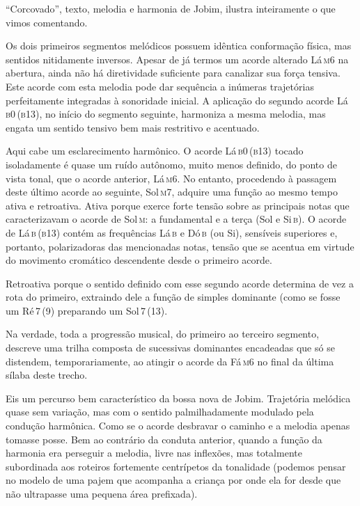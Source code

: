 ``Corcovado'', texto, melodia e harmonia de Jobim, ilustra inteiramente o
que vimos comentando.



Os dois primeiros segmentos melódicos possuem idêntica conformação
física, mas sentidos nitidamente inversos. Apesar de já termos um acorde
alterado Lá\,\textsc{m6} na abertura, ainda não há diretividade suficiente para
canalizar sua força tensiva. Este acorde com esta melodia pode dar
sequência a inúmeras trajetórias perfeitamente integradas à sonoridade
inicial. A aplicação do segundo acorde Lá\,\textsc{b0\,(b13)}, no início do
segmento seguinte, harmoniza a mesma melodia, mas engata um sentido
tensivo bem mais restritivo e acentuado.

Aqui cabe um esclarecimento harmônico. O acorde Lá\,\textsc{b0\,(b13)} tocado
isoladamente é quase um ruído autônomo, muito menos definido, do ponto
de vista tonal, que o acorde anterior, Lá\,\textsc{m6}. No entanto, procedendo à
passagem deste último acorde ao seguinte, Sol\,\textsc{m7}, adquire uma função ao
mesmo tempo ativa e retroativa. Ativa porque exerce forte tensão sobre
as principais notas que caracterizavam o acorde de Sol\,\textsc{m}: a fundamental e
a terça (Sol e Si\,\textsc{b}). O acorde de Lá\,\textsc{b\,(b13)} contém as frequências Lá\,\textsc{b} e
Dó\,\textsc{b} (ou Si), sensíveis superiores e, portanto, polarizadoras das
mencionadas notas, tensão que se acentua em virtude do movimento
cromático descendente desde o primeiro acorde. 



Retroativa porque o sentido definido com esse segundo acorde determina
de vez a rota do primeiro, extraindo dele a função de simples dominante
(como se fosse um Ré\,\textsc{7\,(9)} preparando um Sol\,\textsc{7\,(13)}.

Na verdade, toda a progressão musical, do primeiro ao terceiro segmento,
descreve uma trilha composta de sucessivas dominantes encadeadas que só
se distendem, temporariamente, ao atingir o acorde da Fá\,\textsc{m6} no final da
última sílaba deste trecho.


Eis um percurso bem característico da bossa nova de Jobim. Trajetória
melódica quase sem variação, mas com o sentido palmilhadamente modulado
pela condução harmônica. Como se o acorde desbravar o caminho e a
melodia apenas tomasse posse. Bem ao contrário da conduta anterior,
quando a função da harmonia era perseguir a melodia, livre nas
inflexões, mas totalmente subordinada aos roteiros fortemente
centrípetos da tonalidade (podemos pensar no modelo de uma pajem que
acompanha a criança por onde ela for desde que não ultrapasse uma
pequena área prefixada).

